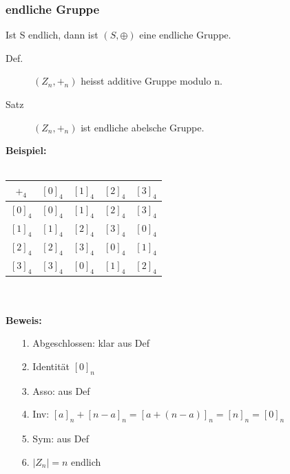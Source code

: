 \documentclass[a4paper,10pt]{article}
\newcommand{\Bold}[1]{\textbf{#1}} %
\begin{document}
\subsubsection{endliche Gruppe}
Ist S endlich, dann ist $(S, \oplus)$ eine endliche Gruppe.
\begin{description}
	\item[Def.] $(Z_n,+_n)$ heisst additive Gruppe modulo n.
	\item[Satz] $(Z_n,+_n)$ ist endliche abelsche Gruppe.
\end{description}
\Bold {Beispiel:} \\ \\
\begin{tabular}{c | c | c | c | c }
	$+_4$ & $[0]_4$ & $[1]_4$ & $[2]_4$ & $[3]_4$ \\
	\hline
	$[0]_4$ & $[0]_4$ & $[1]_4$ & $[2]_4$ & $[3]_4$ \\
	\hline
	$[1]_4$ & $[1]_4$ & $[2]_4$ & $[3]_4$ & $[0]_4$ \\
	\hline
	$[2]_4$ & $[2]_4$ & $[3]_4$ & $[0]_4$ & $[1]_4$ \\
	\hline
	$[3]_4$ & $[3]_4$ & $[0]_4$ & $[1]_4$ & $[2]_4$
\end{tabular} \\ \\
\Bold {Beweis:}
\begin{itemize}
	\item[1.] Abgeschlossen: klar aus Def
	\item[2.] Identit\"at $[0]_n$
	\item[3.] Asso: aus Def
	\item[4.] Inv: $[a]_n  + [n-a]_n = [a+(n-a)]_n=[n]_n=[0]_n$
	\item[5.] Sym: aus Def
	\item[6.] $|Z_n|=n$ endlich
\end{itemize}
\end{document}
